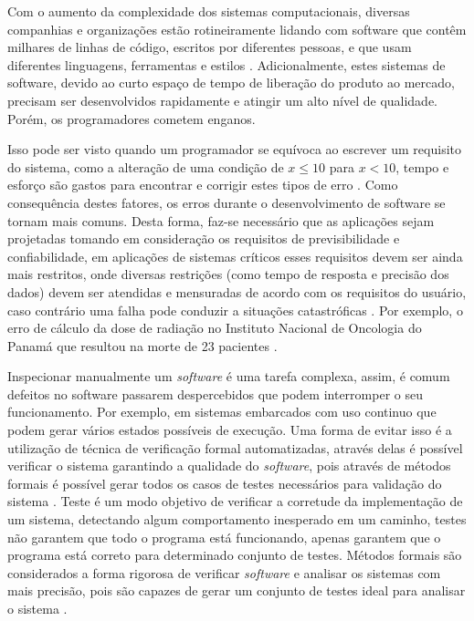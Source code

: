 Com o aumento da complexidade dos sistemas computacionais, diversas
companhias e organizações estão
rotineiramente lidando com software que contêm milhares de linhas de
código, escritos por diferentes pessoas, e que usam diferentes
linguagens, ferramentas e estilos \cite{Hoder:2011}. Adicionalmente,
estes sistemas de software, devido ao curto espaço de tempo de
liberação do produto ao mercado, precisam ser desenvolvidos
rapidamente e atingir um alto nível de qualidade. Porém, os
programadores cometem enganos.
\par
Isso pode ser visto quando um programador se equívoca ao escrever
um requisito do sistema, como a alteração
de uma condição de $x \leq 10$ para $x < 10$, tempo e
esforço são gastos para encontrar e corrigir estes tipos de erro
\cite{Gupta:2009}. Como consequência destes fatores, os erros durante
o desenvolvimento de software se tornam mais comuns. Desta forma, faz-se
necessário que as aplicações sejam projetadas tomando em consideração os
requisitos de previsibilidade e confiabilidade, em
aplicações de sistemas críticos esses requisitos devem ser ainda mais
restritos, onde diversas restrições (como tempo
de resposta e precisão dos dados) devem ser atendidas e mensuradas de
acordo com os requisitos do usuário, caso contrário uma falha pode
conduzir a situações catastróficas \cite{Rocha:2015tese}. Por exemplo, o erro de cálculo da
dose de radiação no Instituto Nacional de Oncologia do Panamá que
resultou na morte de 23 pacientes \cite{Wong:2010, Merz:2012}.


\par
Inspecionar manualmente um \textit{software} é uma tarefa complexa, assim, é comum defeitos no software passarem despercebidos que podem interromper o seu funcionamento. 
Por exemplo, em sistemas embarcados com uso continuo que podem gerar vários estados possíveis de execução. Uma forma de evitar isso é a utilização de técnica de verificação formal automatizadas, através delas é possível verificar o sistema garantindo a qualidade do \textit{software}, pois através de métodos formais é possível gerar todos os casos de testes necessários para validação do sistema \cite{dsilva:2008}. Teste é um modo objetivo de verificar a corretude da implementação de um sistema, detectando algum comportamento inesperado em um caminho, testes não garantem que todo o programa está funcionando, apenas garantem que o programa está correto para determinado conjunto de testes. Métodos formais são considerados a forma rigorosa de verificar \textit{software} e analisar os sistemas com mais precisão, pois são capazes de gerar um conjunto de testes ideal para analisar o sistema \cite{ding:2008}.


